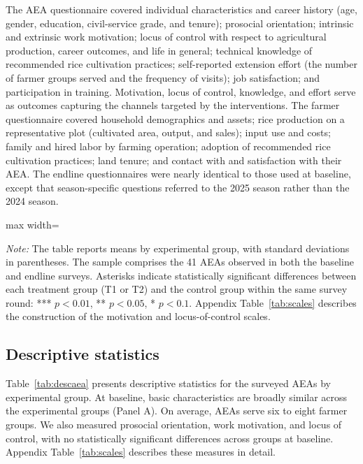 \documentclass[11pt]{article}
\newcommand{\fittable}[1]{%
  \begin{adjustbox}{max width=\linewidth}\scriptsize\end{adjustbox}}
\newcommand{\tnote}[1]{%
  \par\vspace{3pt}%
  \noindent\begin{minipage}{\linewidth}%
    \scriptsize\setlength{\parindent}{0pt}\textit{Note:} #1%
  \end{minipage}}
\begin{document}
The AEA questionnaire covered individual characteristics and career history (age, gender, education, civil-service grade, and tenure); prosocial orientation; intrinsic and extrinsic work motivation; locus of control with respect to agricultural production, career outcomes, and life in general; technical knowledge of recommended rice cultivation practices; self-reported extension effort (the number of farmer groups served and the frequency of visits); job satisfaction; and participation in training. Motivation, locus of control, knowledge, and effort serve as outcomes capturing the channels targeted by the interventions.
The farmer questionnaire covered household demographics and assets; rice production on a representative plot (cultivated area, output, and sales); input use and costs; family and hired labor by farming operation; adoption of recommended rice cultivation practices; land tenure; and contact with and satisfaction with their AEA. The endline questionnaires were nearly identical to those used at baseline, except that season-specific questions referred to the 2025 season rather than the 2024 season.

\begin{table}
\centering
\caption{Descriptive statistics: extension agents}
\label{tab:descaea}
\fittable{tmp/desc_ms_aea}
\tnote{The table reports means by experimental group, with standard
deviations in parentheses. The sample comprises the 41 AEAs
observed in both the baseline and endline surveys.
Asterisks indicate statistically significant differences
between each treatment group (T1 or T2) and the control group
within the same survey round:
*** $p<0.01$, ** $p<0.05$, * $p<0.1$.
Appendix Table~\ref{tab:scales} describes the construction
of the motivation and locus-of-control scales.}

\end{table}

\subsection{Descriptive statistics}

Table~\ref{tab:descaea} presents descriptive statistics for the surveyed AEAs by experimental group. At baseline, basic characteristics are broadly similar across the experimental groups (Panel A). On average, AEAs serve six to eight farmer groups. We also measured prosocial orientation, work motivation, and locus of control, with no statistically significant differences across groups at baseline. Appendix Table~\ref{tab:scales} describes these measures in detail.
\end{document}
